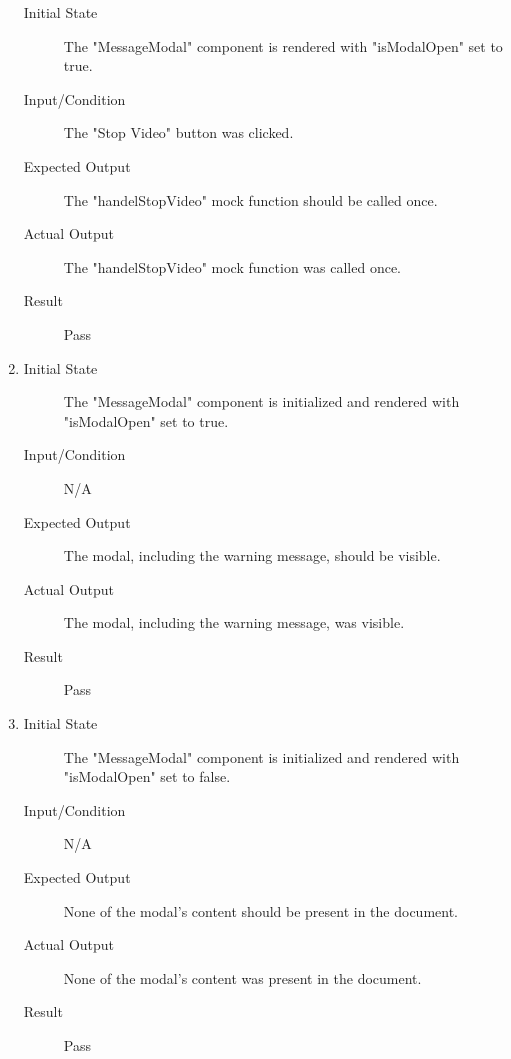 \documentclass[12pt, titlepage]{article}
\begin{document}
\begin{enumerate}[UT-OT1]
\begin{description}
    \item[Initial State] The "MessageModal" component is rendered with "isModalOpen" set to true.
    \item[Input/Condition] The "Stop Video" button was clicked.
    \item[Expected Output] The "handelStopVideo" mock function should be called once.
    \item[Actual Output] The "handelStopVideo" mock function was called once.
    \item[Result] Pass
    \end{description}
  \item \label{UT-OT5}
    \begin{description}
    \item[Initial State] The "MessageModal" component is initialized and rendered with "isModalOpen" set to true.
    \item[Input/Condition] N/A
    \item[Expected Output] The modal, including the warning message, should be visible.
    \item[Actual Output] The modal, including the warning message, was visible.
    \item[Result] Pass
    \end{description}
  \item \label{UT-OT6}
    \begin{description}
    \item[Initial State] The "MessageModal" component is initialized and rendered with "isModalOpen" set to false.
    \item[Input/Condition] N/A
    \item[Expected Output] None of the modal's content should be present in the document.
    \item[Actual Output] None of the modal's content was present in the document.
    \item[Result] Pass
    \end{description}
\end{enumerate}
\end{document}
